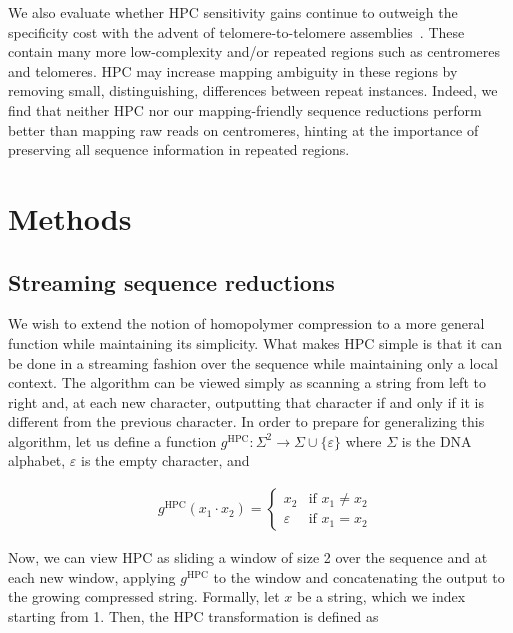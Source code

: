 \documentclass[
  11pt,
  twoside]{scrbook}
\begin{document}
We also evaluate whether HPC sensitivity gains continue to outweigh the specificity cost with the advent of telomere-to-telomere assemblies~\autocite{nurk2022}. These contain many more low-complexity and/or repeated regions such as centromeres and telomeres. HPC may increase mapping ambiguity in these regions by removing small, distinguishing, differences between repeat instances. Indeed, we find that neither HPC nor our mapping-friendly sequence reductions perform better than mapping raw reads on centromeres, hinting at the importance of preserving all sequence information in repeated regions.

\hypertarget{methods}{%
\section{Methods}\label{methods}}

\hypertarget{sec:msr-def}{%
\subsection{Streaming sequence reductions}\label{sec:msr-def}}

We wish to extend the notion of homopolymer compression to a more general function while maintaining its simplicity. What makes HPC simple is that it can be done in a streaming fashion over the sequence while maintaining only a local context. The algorithm can be viewed simply as scanning a string from left to right and, at each new character, outputting that character if and only if it is different from the previous character. In order to prepare for generalizing this algorithm, let us define a function \(g^\text{HPC} : \Sigma^2\rightarrow\Sigma\cup\{\varepsilon\}\) where \(\Sigma\) is the DNA alphabet, \(\varepsilon\) is the empty character, and

\begin{align*}
    & g^\text{HPC}(x_1\cdot x_2) =
    \begin{cases}
        x_2 & \text{if } x_1 \neq x_2 \\
        \varepsilon & \text{if } x_1 = x_2
    \end{cases}
\end{align*}

Now, we can view HPC as sliding a window of size 2 over the sequence and at each new window, applying \(g^\text{HPC}\) to the window and concatenating the output to the growing compressed string. Formally, let \(x\) be a string, which we index starting from 1. Then, the HPC transformation is defined as
\end{document}
